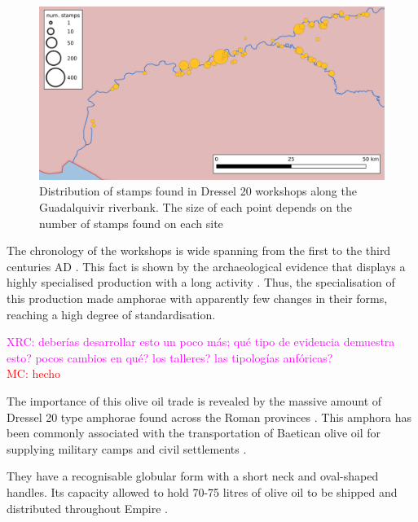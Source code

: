 \documentclass[review]{elsarticle}
\newcommand{\memo}[2]{\textcolor{#1}{#2}}
\newcommand{\maria}[1]{\memo{red}{MC: #1\\}}
\newcommand{\xavi}[1]{\memo{magenta}{XRC: #1\\}}
\begin{document}
\begin{figure}[htp]
	\centering
\includegraphics[width=\linewidth]{figs/baetica}
\caption{Distribution of stamps found in Dressel 20 workshops along the Guadalquivir riverbank. The size of each point depends on the number of stamps found on each site}

\label{workshop}
\end{figure} 


The chronology of the workshops is wide spanning from the first to the third centuries AD
\citep{millet_anforas_1998,rodriguez_baetican_1998,chic2005comercio}. 
This fact is shown by the archaeological evidence that displays a highly specialised production with a long activity \citep{remesal_anforas_2004}. Thus, the specialisation of this production made amphorae with apparently few changes in their forms, reaching a high degree of standardisation. 


\xavi{deberías desarrollar esto un poco más; qué tipo de evidencia demuestra esto? pocos cambios en qué? los talleres? las tipologías anfóricas?}
\maria{hecho}

The importance of this olive oil trade is revealed by the massive amount of Dressel 20 type amphorae found across the Roman provinces \citep{dressel_ricerche_1878,
millet_anforas_1998}. This amphora has been commonly associated with the transportation of Baetican olive oil for supplying military camps and civil settlements \citep{berni_millet_epigrafianforica_2008}.%

They have a recognisable globular form with a short neck and oval-shaped handles. Its capacity allowed to hold 70-75 litres of olive oil to be shipped and distributed throughout Empire \citep{berni_dressel_2016}.
\end{document}

